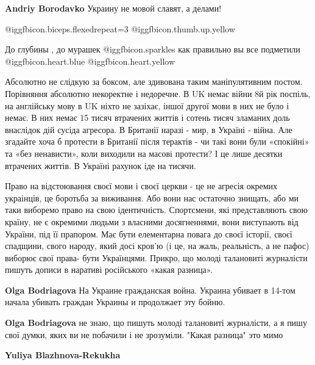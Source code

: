 \begin{itemize}
\begin{itemize}
\textbf{Andriy Borodavko} Украину не мовой славят, а делами!

\end{itemize} %

 @igg{fbicon.biceps.flexed}{repeat=3}  @igg{fbicon.thumb.up.yellow} 

До глубины , до мурашек  @igg{fbicon.sparkles}  как правильно вы все подметили  @igg{fbicon.heart.blue}  @igg{fbicon.heart.yellow} 


Абсолютно не слідкую за боксом, але здивована таким маніпулятивним постом.
Порівняння абсолютно некоректне і недоречне. В UK немає війни 8й рік поспіль,
на англійську мову в UK ніхто не зазіхає, іншої другої мови в них не було і
немає. В них немає 15 тисяч втрачених життів і сотень тисяч зламаних доль
внаслідок дій сусіда агресора. В Британії наразі - мир, в Україні - війна. Але
згадайте хоча б протести в Британії після терактів - чи такі вони були
«спокійні» та «без ненависти», коли виходили на масові протести? І це лише
десятки втрачених життів. В Україні рахунок іде на тисячи.

Право на відстоювання своєї мови і своєї церкви - це не агресія окремих
украінців, це боротьба за виживання. Або вони нас остаточно знищать, або ми
таки виборемо право на свою ідентичність. Спортсмени, які представляють свою
країну, не є окремими людьми з власними досягненнями, вони виступають від
України, під її прапором. Має бути елементарна повага до своєї історії, своєї
спадщини, свого народу, який досі кров’ю (і це, на жаль, реальність, а не
пафос) виборює свої права- бути Українцями. Прикро, що молоді талановиті
журналісти пишуть дописи в наративі російського «какая разница».

\begin{itemize} %


\textbf{Olga Bodriagova} На Украине гражданская война. Украина убивает в 14-том начала убивать граждан Украины и продолжает эту бойню.

\textbf{Olga Bodriagova} не знаю, що пишуть молоді талановиті журналісти, а я пишу свої думки, яких ви не побачили і не зрозуміли. "Какая разница" это мимо

\textbf{Yuliya Blazhnova-Rekukha} 


\end{itemize}
\end{itemize}
